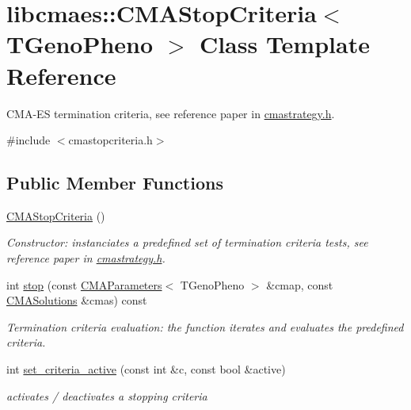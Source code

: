 \hypertarget{classlibcmaes_1_1CMAStopCriteria}{\section{libcmaes\-:\-:C\-M\-A\-Stop\-Criteria$<$ T\-Geno\-Pheno $>$ Class Template Reference}
\label{classlibcmaes_1_1CMAStopCriteria}
}


C\-M\-A-\/\-E\-S termination criteria, see reference paper in \hyperlink{cmastrategy_8h_source}{cmastrategy.\-h}.  




{\ttfamily \#include $<$cmastopcriteria.\-h$>$}

\subsection*{Public Member Functions}
\begin{DoxyCompactItemize}
\item 
\hypertarget{classlibcmaes_1_1CMAStopCriteria_a8b7795af41cba9122799e221d3b95b7b}{\hyperlink{classlibcmaes_1_1CMAStopCriteria_a8b7795af41cba9122799e221d3b95b7b}{C\-M\-A\-Stop\-Criteria} ()}\label{classlibcmaes_1_1CMAStopCriteria_a8b7795af41cba9122799e221d3b95b7b}

\begin{DoxyCompactList}\small\item\em Constructor\-: instanciates a predefined set of termination criteria tests, see reference paper in \hyperlink{cmastrategy_8h_source}{cmastrategy.\-h}. \end{DoxyCompactList}\item 
int \hyperlink{classlibcmaes_1_1CMAStopCriteria_a6049e6ee663be2aa8781e9bd3cf9cba8}{stop} (const \hyperlink{classlibcmaes_1_1CMAParameters}{C\-M\-A\-Parameters}$<$ T\-Geno\-Pheno $>$ \&cmap, const \hyperlink{classlibcmaes_1_1CMASolutions}{C\-M\-A\-Solutions} \&cmas) const 
\begin{DoxyCompactList}\small\item\em Termination criteria evaluation\-: the function iterates and evaluates the predefined criteria. \end{DoxyCompactList}\item 
int \hyperlink{classlibcmaes_1_1CMAStopCriteria_a3c49ee85e48d2104fc47eb5fe0886f55}{set\-\_\-criteria\-\_\-active} (const int \&c, const bool \&active)
\begin{DoxyCompactList}\small\item\em activates / deactivates a stopping criteria \end{DoxyCompactList}\end{DoxyCompactItemize}
